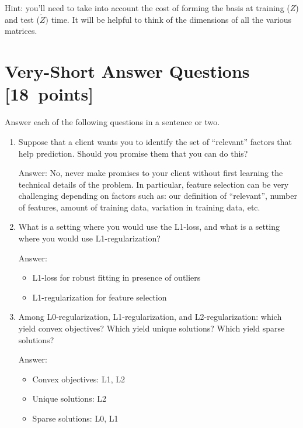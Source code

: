\documentclass{article}
\newcommand{\blu}[1]{{\textcolor{blu}{#1}}}
\newenvironment{answer}{\par\begingroup\color{gre}Answer: }{\endgroup}
\let\ask\blu
\newcommand\pts[1]{\textcolor{pointscolour}{[#1~points]}}
\begin{document}
Hint: you'll need to take into account the cost of forming the basis at training ($Z$) and test ($\tilde{Z})$ time. It will be helpful to think of the dimensions of all the various matrices.


\clearpage
\section{Very-Short Answer Questions \pts{18}}

\ask{Answer each of the following questions in a sentence or two.}
\begin{enumerate}

\item Suppose that a client wants you to identify the set of ``relevant'' factors that help prediction. Should you promise them that you can do this?
\begin{answer}
    No, never make promises to your client without first learning the technical details of the problem. In particular, feature selection can be very challenging depending on factors such as: our definition of ``relevant'', number of features, amount of training data, variation in training data, etc.
\end{answer}

\item What is a setting where you would use the L1-loss, and what is a setting where you would use L1-regularization?
\begin{answer}
    \begin{itemize}
        \item L1-loss for robust fitting in presence of outliers
        \item L1-regularization for feature selection
    \end{itemize}
\end{answer}

\item Among L0-regularization, L1-regularization, and L2-regularization: which yield convex objectives? Which yield unique solutions? Which yield sparse solutions?
\begin{answer}
    \begin{itemize}
        \item Convex objectives: L1, L2
        \item Unique solutions: L2
        \item Sparse solutions: L0, L1
    \end{itemize}
\end{answer}


\end{enumerate}
\end{document}

